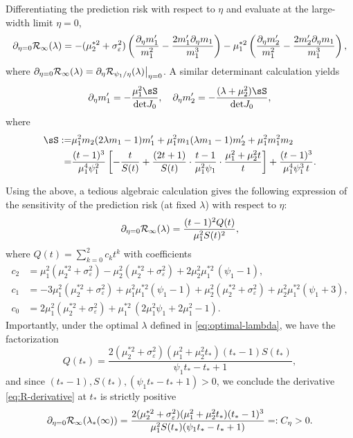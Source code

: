Differentiating the prediction risk with respect to $\eta$ and evaluate at the large-width limit $\eta=0$,
\[
\partial_{\eta=0} {\mathcal R}_{\infty}(\lambda) = -(\mu_2^{*2} + \sigma_\varepsilon^2)\left(\frac{\partial_\eta m_1'}{m_1^2} - \frac{2m_1' \partial_\eta m_1}{m_1^3}\right) -\mu_1^{*2}\left(\frac{\partial_\eta m_2'}{m_1^2} - \frac{2m_2'\partial_\eta m_1}{m_1^3}\right),  
\]
where $\partial_{\eta=0} {\mathcal R}_{\infty}(\lambda) = \partial_\eta {\mathcal R}_{\psi_1/\eta}(\lambda) \big|_{\eta=0}$. 
A similar determinant calculation yields
\[
\partial_\eta m_1' = -\frac{\mu_1^2\sS}{\mathrm{det}J_0}, \quad \partial_\eta m_2' = -\frac{(\lambda+\mu_2^2)\sS}{\mathrm{det}J_0},
\]
where 
\begin{align*}
\sS :=& \mu_1^2 m_2(2\lambda m_1-1) m_1' + \mu_1^2 m_1(\lambda m_1-1)  m_2' + \mu_1^2 m_1^2 m_2 
\\ 
=& \frac{(t-1)^3}{\mu_1^4\psi_1^2}\left[-\frac{t}{S(t)}
+\frac{(2t+1)}{S(t)}\cdot\frac{t-1}{\mu_1^2\psi_1}\cdot\frac{\mu_1^2+\mu_2^2t}{t}\right]
+\frac{(t-1)^3}{\mu_1^4\psi_1^3\,t}.
\end{align*}


Using the above, a tedious algebraic calculation gives the following expression of the sensitivity of the prediction risk (at fixed $\lambda$) with respect to $\eta$:
\begin{align}
    \partial_{\eta=0} {\mathcal R}_{\infty}(\lambda) = \frac{(t-1)^2 Q(t)}{\mu_1^2S(t)^2}, \label{eq:R-derivative}
\end{align}
where $Q(t)=\sum_{k=0}^2 c_k t^k$ with coefficients
\begin{align*}
c_2&=\mu_1^2(\mu_2^{*2} + \sigma_\varepsilon^2) - \mu_2^2(\mu_2^{*2} + \sigma_\varepsilon^2) + 2\mu_2^2\mu_1^{*2}\,(\psi_1-1),\\
c_1&=-3\mu_1^2(\mu_2^{*2} + \sigma_\varepsilon^2) + \mu_1^2\mu_1^{*2}(\psi_1-1) + \mu_2^2(\mu_2^{*2} + \sigma_\varepsilon^2) + \mu_2^2\mu_1^{*2}(\psi_1+3),\\
c_0&=2\mu_1^2(\mu_2^{*2} + \sigma_\varepsilon^2) + \mu_1^{*2}\,(2\mu_1^2\psi_1+2\mu_1^2-1).
\end{align*}
Importantly, under the optimal $\lambda$ defined in \eqref{eq:optimal-lambda}, we have the factorization
\[
Q(t_*) = \frac{2(\mu_2^{*2} + \sigma_\varepsilon^2)(\mu_1^2+\mu_2^2t_*)(t_*-1)S(t_*)}{\psi_1 t_*-t_*+1}, 
\]
and since $(t_*-1), S(t_*), (\psi_1 t_* -t_*+1)>0$, we conclude the derivative \eqref{eq:R-derivative} at $t_*$ is strictly positive
\begin{align}
    \partial_{\eta=0} {\mathcal R}_{\infty}(\lambda_*(\infty)) = \frac{2(\mu_2^{*2} + \sigma_\varepsilon^2) (\mu_1^2+\mu_2^2t_*)(t_*-1)^3}{\mu_1^2S(t_*)(\psi_1 t_*-t_*+1)} =: C_\eta > 0. 
    \label{eq:C-eta}
\end{align}

